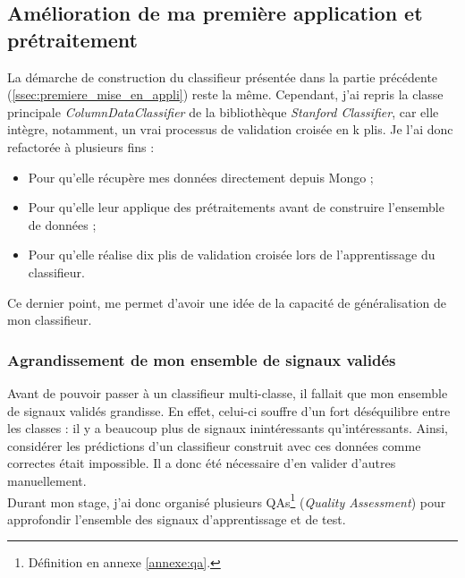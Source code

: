         \subsection{Amélioration de ma première application et prétraitement}
            La démarche de construction du classifieur présentée dans la partie précédente (\ref{ssec:premiere_mise_en_appli}) reste la même. Cependant, j'ai repris la classe principale \textit{ColumnDataClassifier} de la bibliothèque \textit{Stanford Classifier}, car elle intègre, notamment, un vrai processus de validation croisée en k plis. Je l'ai donc refactorée à plusieurs fins :
            \begin{itemize}
                \item Pour qu'elle récupère mes données directement depuis Mongo ;
                \item Pour qu'elle leur applique des prétraitements avant de construire l'ensemble de données ;
                \item Pour qu'elle réalise dix plis de validation croisée lors de l'apprentissage du classifieur.
            \end{itemize}
            Ce dernier point, me permet d'avoir une idée de la capacité de généralisation de mon classifieur.
            \subsubsection{Agrandissement de mon ensemble de signaux validés}
                Avant de pouvoir passer à un classifieur multi-classe, il fallait que mon ensemble de signaux validés grandisse. En effet, celui-ci souffre d'un fort déséquilibre entre les classes : il y a beaucoup plus de signaux inintéressants qu'intéressants. Ainsi, considérer les prédictions d'un classifieur construit avec ces données comme correctes était impossible. Il a donc été nécessaire d'en valider d'autres manuellement.\\

                Durant mon stage, j'ai donc organisé plusieurs QAs\footnote{Définition en annexe \ref{annexe:qa}.} (\textit{Quality Assessment}) pour approfondir l'ensemble des signaux d’apprentissage et de test.

